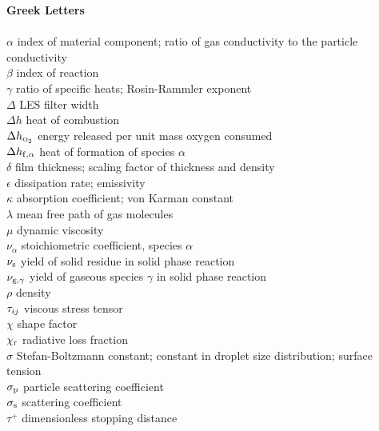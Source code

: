\begin{tabbing}
{\bf Greek Letters}       \> \\
\hspace{0.1in}            \> \\
$\alpha$                  \> index of material component; ratio of gas conductivity to the particle conductivity \\
$\beta$                   \> index of reaction \\
$\gamma$                  \> ratio of specific heats; Rosin-Rammler exponent \\
$\Delta$                  \> LES filter width \\
$\Delta h$                \> heat of combustion \\
$\Delta h_{\text{\tiny \hbox{O}$_2$}}$          \> energy released per unit mass oxygen consumed \\
$\Delta h_{\rm f,\alpha}$ \> heat of formation of species $\alpha$ \\
$\delta$                  \> film thickness; scaling factor of thickness and density \\
$\epsilon$                \> dissipation rate; emissivity \\
$\kappa$                  \> absorption coefficient; von Karman constant \\
$\lambda$                 \> mean free path of gas molecules \\
$\mu$                     \> dynamic viscosity \\
$\nu_\alpha$              \> stoichiometric coefficient, species $\alpha$ \\
$\nu_{\rm s}$             \> yield of solid residue in solid phase reaction \\
$\nu_{{\rm g},\gamma}$    \> yield of gaseous species $\gamma$ in solid phase reaction \\
$\rho$                    \> density \\
$\mathbf{\tau}_{ij}$              \> viscous stress tensor \\
$\chi$                    \> shape factor \\
$\chi_{\rm r}$            \> radiative loss fraction \\
$\sigma$                  \> Stefan-Boltzmann constant; constant in droplet size distribution; surface tension \\
$\sigma_{\rm p}$          \> particle scattering coefficient \\
$\sigma_{\rm s}$          \> scattering coefficient \\
$\tau^+$                  \> dimensionless stopping distance \\

\end{tabbing}
